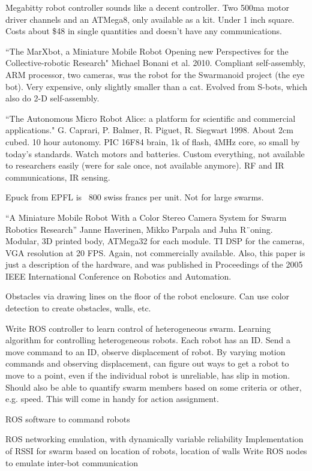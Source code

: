 \documentclass[]{article}
\begin{document}
Megabitty robot controller sounds like a decent controller. Two 500ma motor driver channels and an ATMega8, only available as a kit. Under 1 inch square. Costs about \$48 in single quantities and doesn't have any communications. 

``The MarXbot, a Miniature Mobile Robot Opening new Perspectives for the Collective-robotic Research" \cite{bonani2010marxbot} Michael Bonani et al. 2010. Compliant self-assembly, ARM processor, two cameras, was the robot for the Swarmanoid project (the eye bot). Very expensive, only slightly smaller than a cat. Evolved from S-bots, which also do 2-D self-assembly. 

``The Autonomous Micro Robot Alice: a platform for scientific and commercial applications." \cite{caprari1998autonomous} G. Caprari, P. Balmer, R. Piguet, R. Siegwart 1998. About 2cm cubed. 10 hour autonomy. PIC 16F84 brain, 1k of flash, 4MHz core, so small by today's standards. Watch motors and batteries. Custom everything, not available to researchers easily (were for sale once, not available anymore). RF and IR communications, IR sensing. 

Epuck from EPFL is ~800 swiss francs per unit. Not for large swarms. 

``A Miniature Mobile Robot With a Color Stereo Camera System for Swarm Robotics Research'' \cite{haverinen2005miniature} Janne Haverinen, Mikko Parpala and Juha R¨oning. 
Modular, 3D printed body, ATMega32 for each module. TI DSP for the cameras, VGA resolution at 20 FPS. Again, not commercially available. Also, this paper is just a description of the hardware, and was published in Proceedings of the 2005 IEEE International Conference on Robotics and Automation. 

Obstacles via drawing lines on the floor of the robot enclosure. Can use color detection to create obstacles, walls, etc. 

Write ROS controller to learn control of heterogeneous swarm.
Learning algorithm for controlling heterogeneous robots. 
Each robot has an ID. Send a move command to an ID, observe displacement of robot. 
By varying motion commands and observing displacement, can figure out ways to get a robot to move to a point, even if the individual robot is unreliable, has slip in motion. 
Should also be able to quantify swarm members based on some criteria or other, e.g. speed. This will come in handy for action assignment.

ROS software to command robots

ROS networking emulation, with dynamically variable reliability
Implementation of RSSI for swarm based on location of robots, location of walls
Write ROS nodes to emulate inter-bot communication
\end{document}
